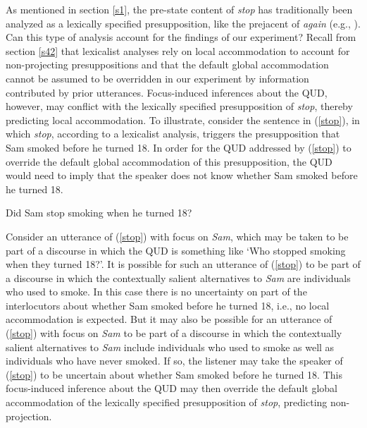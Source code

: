 \documentclass[a4paper,12pt]{article}
\newcommand{\6}{\mbox{$[\hspace*{-.6mm}[$}}
\newcommand{\9}{\mbox{$]\hspace*{-.6mm}]$}}
\begin{document}
As mentioned in section \ref{s1}, the pre-state content of {\em stop} has traditionally been analyzed as a lexically specified presupposition, like the prejacent of {\em again} (e.g., \citealt{heim83,vds92,kadmon01}). Can this type of analysis account for the findings of our experiment? Recall from section \ref{s42} that lexicalist analyses rely on local accommodation to account for non-projecting presuppositions and that the default global accommodation cannot be assumed to be overridden in our experiment by information contributed by prior utterances. Focus-induced inferences about the QUD, however, may conflict with the lexically specified presupposition of {\em stop}, thereby predicting local accommodation. To illustrate, consider the sentence in (\ref{stop}), in which {\em stop}, according to a lexicalist analysis, triggers the presupposition that Sam smoked before he turned 18. In order for the QUD addressed by (\ref{stop}) to override the default global accommodation of this presupposition, the QUD would need to imply that the speaker does not know whether Sam smoked before he turned 18.

\begin{exe}
\ex\label{stop} Did Sam stop smoking when he turned 18?
\end{exe} 
Consider an utterance of (\ref{stop}) with focus on {\em Sam}, which may be taken to be part of a discourse in which the QUD is something like `Who stopped smoking when they turned 18?'. It is possible for such an utterance of (\ref{stop}) to be part of a discourse in which the contextually salient alternatives to {\em Sam} are individuals who used to smoke. In this case there is no uncertainty on part of the interlocutors about whether Sam smoked before he turned 18, i.e., no local accommodation is expected. But it may also be possible for an utterance of (\ref{stop}) with focus on {\em Sam} to be part of a discourse in which the contextually salient alternatives to {\em Sam} include individuals who used to smoke as well as individuals who have never smoked. If so, the listener may take the speaker of (\ref{stop}) to be uncertain about whether Sam smoked before he turned 18. This focus-induced inference about the QUD may then override the default global accommodation of the lexically specified presupposition of {\em stop}, predicting non-projection. 
\end{document}
